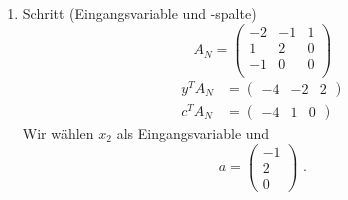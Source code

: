 \documentclass[a4paper]{scrartcl}
\begin{document}
\begin{enumerate}[label=\bfseries\arabic*.]
\begin{enumerate}
\begin{enumerate}[1.]
\begin{enumerate}[1.]
                            \item Schritt (Eingangsvariable und -spalte)
                                \begin{equation}
                                    A_N =
                                    \begin{pmatrix}
                                        -2 & -1 &  1 \\
                                         1 &  2 &  0 \\
                                        -1 &  0 &  0 \\
                                    \end{pmatrix}
                                \end{equation}
                                \begin{align}
                                    y^TA_N &=
                                    \begin{pmatrix}
                                        -4 & -2 & 2
                                    \end{pmatrix} \\
                                    c^TA_N &=
                                    \begin{pmatrix}
                                        -4 & 1 & 0
                                    \end{pmatrix}
                                \end{align}
                                Wir wählen $x_2$ als Eingangsvariable und
                                \begin{equation}
                                    a =
                                    \begin{pmatrix}
                                        -1 \\ 2 \\ 0
                                    \end{pmatrix}
                                    \text{ .}   
                                \end{equation}


\end{enumerate}
\end{enumerate}
\end{enumerate}
\end{enumerate}
\end{document}
